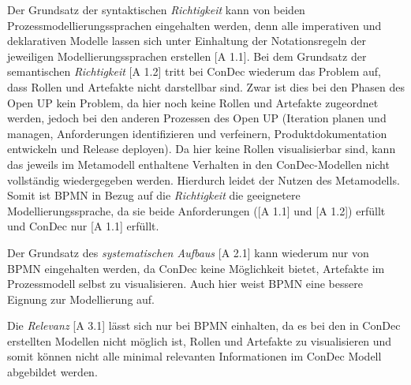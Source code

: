 Der Grundsatz der syntaktischen \textit{Richtigkeit} kann von beiden Prozessmodellierungssprachen eingehalten werden, denn alle imperativen und deklarativen Modelle lassen sich unter Einhaltung der Notationsregeln der jeweiligen Modellierungssprachen erstellen [A 1.1].\newline
Bei dem Grundsatz der semantischen \textit{Richtigkeit} [A 1.2] tritt bei ConDec wiederum das Problem auf, dass Rollen und Artefakte nicht darstellbar sind. Zwar ist dies bei den Phasen des Open UP kein Problem, da hier noch keine Rollen und Artefakte zugeordnet werden, jedoch bei den anderen Prozessen des Open UP (Iteration planen und managen, Anforderungen identifizieren und verfeinern, Produktdokumentation entwickeln und Release deployen). Da hier keine Rollen visualisierbar sind, kann das jeweils im Metamodell enthaltene Verhalten in den ConDec-Modellen nicht vollständig wiedergegeben werden. Hierdurch leidet der Nutzen des Metamodells. \newline
Somit ist BPMN in Bezug auf die \textit{Richtigkeit} die geeignetere Modellierungssprache, da sie beide Anforderungen ([A 1.1] und [A 1.2]) erfüllt und ConDec nur [A 1.1] erfüllt.\newline

Der Grundsatz des \textit{systematischen Aufbaus} [A 2.1] kann wiederum nur von BPMN eingehalten werden, da ConDec keine Möglichkeit bietet, Artefakte im Prozessmodell selbst zu visualisieren.\newline
Auch hier weist BPMN eine bessere Eignung zur Modellierung auf.\newline

Die \textit{Relevanz} [A 3.1] lässt sich nur bei BPMN einhalten, da es bei den in ConDec erstellten Modellen nicht möglich ist, Rollen und Artefakte zu visualisieren und somit können nicht alle minimal relevanten Informationen im ConDec Modell abgebildet werden.\newline

